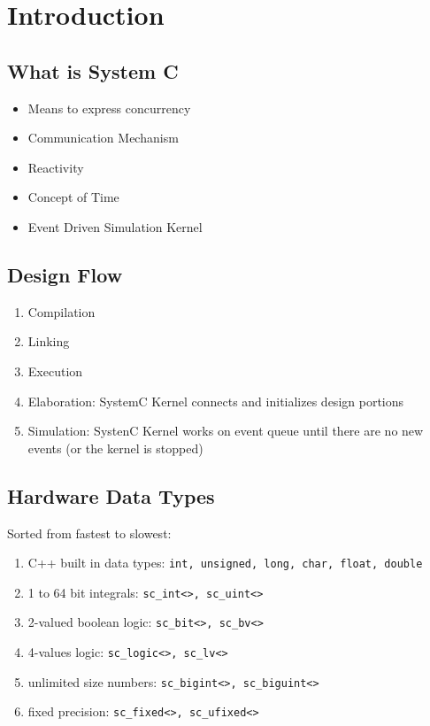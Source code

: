\chapter{Introduction}
\section{What is System C}
\begin{itemize}
    \item Means to express concurrency
    \item Communication Mechanism
    \item Reactivity
    \item Concept of Time
    \item Event Driven Simulation Kernel
\end{itemize}

\section{Design Flow}
\begin{enumerate}
    \item Compilation
    \item Linking
    \item Execution
    \item Elaboration: SystemC Kernel connects and initializes design portions
    \item Simulation: SystenC Kernel works on event queue until there are no new events (or the kernel is stopped)
\end{enumerate}

\section{Hardware Data Types}
Sorted from fastest to slowest:
\begin{enumerate}
    \item C++ built in data types: \lstinline{int, unsigned, long, char, float, double}
    \item 1 to 64 bit integrals: \lstinline{sc_int<>, sc_uint<>}
    \item 2-valued boolean logic: \lstinline{sc_bit<>, sc_bv<>}
    \item 4-values logic: \lstinline{sc_logic<>, sc_lv<>}
    \item unlimited size numbers: \lstinline{sc_bigint<>, sc_biguint<>}
    \item fixed precision: \lstinline{sc_fixed<>, sc_ufixed<>}
\end{enumerate}

